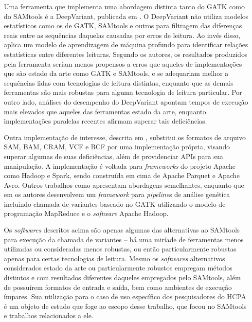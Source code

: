 \documentclass[cic,tc]{iiufrgs}
\begin{document}

Uma ferramenta que implementa uma abordagem distinta tanto do GATK como do
SAMtools é a DeepVariant, publicada em \cite{poplin2018universal}. O DeepVariant
não utiliza modelos estatísticos como os de GATK, SAMtools e outros para
filtragem das diferenças reais entre as sequências daquelas causadas por erros
de leitura. Ao invés disso, aplica um modelo de aprendizagem de máquina
profundo para identificar relações estatísticas entre diferentes leituras.
Segundo os autores, os resultados produzidos pela ferramenta seriam menos
propensos a erros que aqueles de implementações que são estado da arte como
GATK e SAMtools, e se adequariam melhor a sequências lidas com tecnologias de
leitura distintas, enquanto que as demais ferramentas são mais robustas para
alguma tecnologia de leitura particular. Por outro lado, análises do desempenho
do DeepVariant apontam tempos de execução mais elevados que aqueles das
ferramentas estado da arte, enquanto implementações paralelas recentes afirmam
superar tais deficiências. \cite{ahmad2021vc}

Outra implementação de interesse, descrita em \cite{massie2013adam}, substitui
os formatos de arquivo SAM, BAM, CRAM, VCF e BCF por uma implementação própria,
visando superar algumas de suas deficiências, além de providenciar APIs para
sua manipulação. A implementação é voltada para \textit{frameworks} do projeto Apache
como Hadoop e Spark, sendo construída em cima de Apache Parquet e Apache Avro.
Outros trabalhos como \cite{boufea2017managing} apresentam abordagens
semelhantes, enquanto que em \cite{decap2015halvade} os autores desenvolvem um
\textit{framework} para \textit{pipeline}s de análise genética incluindo chamada de variantes
baseado no GATK utilizando o modelo de programação MapReduce e o \textit{software}
Apache Hadoop.

Os \textit{softwares} descritos acima são apenas algumas das alternativas ao SAMtools
para execução da chamada de variantes -- há uma miríade de ferramentas menos
utilizadas ou consideradas menos robustas, ou então particularmente robustas
apenas para certas tecnologias de leitura. Mesmo os \textit{softwares} alternativos
considerados estado da arte ou particularmente robustos empregam métodos
distintos e com resultados diferentes daqueles empregados pelo SAMtools, além
de possuírem formatos de entrada e saída, bem como ambientes de execução
ímpares. Sua utilização para o caso de uso específico dos pesquisadores do HCPA
é um objeto de estudo que foge ao escopo desse trabalho, que focou no SAMtools
e trabalhos relacionados a ele.
\end{document}
